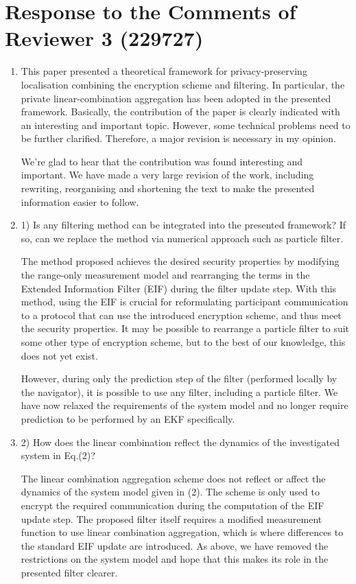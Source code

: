 \documentclass[a4paper]{scrartcl}
\newenvironment{rebuttal}{\begin{enumerate}[label={\color{grey}\thesection.\arabic{enumi}},leftmargin=0pt,ref=\thesection.\arabic{enumi}]}{\end{enumerate}}
\newcommand{\reviewtext}[1]{{\color{nblue} #1}}
\begin{document}
\section*{Response to the Comments of Reviewer 3 (229727)}
\def\thesection{R3}
\begin{rebuttal}
\item \reviewtext{This paper presented a theoretical framework for privacy-preserving localisation combining the encryption scheme and filtering. In particular, the private linear-combination aggregation has been adopted in the presented framework. Basically, the contribution of the paper is clearly indicated with an interesting and important topic. However, some technical problems need to be further clarified. Therefore, a major revision is necessary in my opinion.}

We're glad to hear that the contribution was found interesting and important. We have made a very large revision of the work, including rewriting, reorganising and shortening the text to make the presented information easier to follow.

\item \reviewtext{1) Is any filtering method can be integrated into the presented framework? If so, can we replace the method via numerical approach such as particle filter.}

The method proposed achieves the desired security properties by modifying the range-only measurement model and rearranging the terms in the Extended Information Filter (EIF) during the filter update step. With this method, using the EIF is crucial for reformulating participant communication to a protocol that can use the introduced encryption scheme, and thus meet the security properties. It may be possible to rearrange a particle filter to suit some other type of encryption scheme, but to the best of our knowledge, this does not yet exist.

However, during only the prediction step of the filter (performed locally by the navigator), it is possible to use any filter, including a particle filter. We have now relaxed the requirements of the system model and no longer require prediction to be performed by an EKF specifically.

\item \reviewtext{2) How does the linear combination reflect the dynamics of the investigated system in Eq.(2)?}

The linear combination aggregation scheme does not reflect or affect the dynamics of the system model given in ($2$). The scheme is only used to encrypt the required communication during the computation of the EIF update step. The proposed filter itself requires a modified measurement function to use linear combination aggregation, which is where differences to the standard EIF update are introduced. As above, we have removed the restrictions on the system model and hope that this makes its role in the presented filter clearer.


\end{rebuttal}
\end{document}
